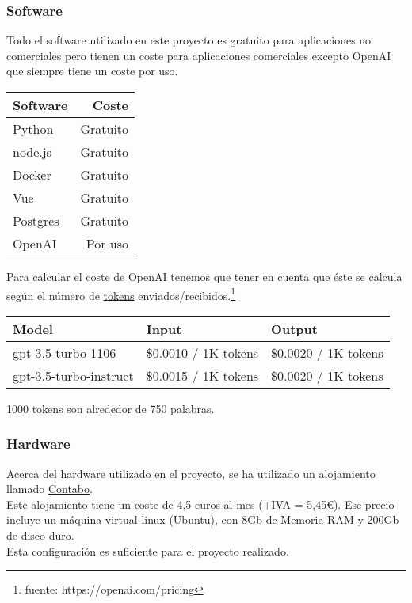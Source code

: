 \subsubsection{Software}
Todo el software utilizado en este proyecto es gratuito para aplicaciones no comerciales pero tienen un 
coste para aplicaciones comerciales excepto OpenAI que siempre tiene un coste por uso.

\begin{tabular}{l r}
    \hline
    \textbf{Software} & \textbf{Coste}\\ \hline
    Python & Gratuito \\ \hline
    node.js & Gratuito\\ \hline
    Docker & Gratuito\\ \hline
    Vue & Gratuito\\ \hline
    Postgres & Gratuito\\ \hline
    OpenAI & Por uso\\ \hline
\end{tabular}


Para calcular el coste de OpenAI tenemos que tener en cuenta que éste se calcula según el 
número de \href{https://platform.openai.com/tokenizer}{tokens} enviados/recibidos.\footnote{fuente: https://openai.com/pricing} \\


\begin{tabular}{l l l}
    \hline
    \textbf{Model}&\textbf{Input}&\textbf{Output}\\ \hline
    gpt-3.5-turbo-1106 & \$0.0010 / 1K tokens & \$0.0020 / 1K tokens\\ \hline
    gpt-3.5-turbo-instruct & \$0.0015 / 1K tokens & \$0.0020 / 1K tokens\\ \hline       
\end{tabular}

1000 tokens son alrededor de 750 palabras.

\subsubsection{Hardware}
Acerca del hardware utilizado en el proyecto, se ha utilizado un alojamiento llamado \href{https://contabo.com/en/}{Contabo}.\\
Este alojamiento tiene un coste de 4,5 euros al mes (+IVA = 5,45€). 
Ese precio incluye un máquina virtual linux (Ubuntu),
con 8Gb de Memoria RAM y 200Gb de disco duro.\\
Esta configuración es suficiente para el proyecto realizado.

